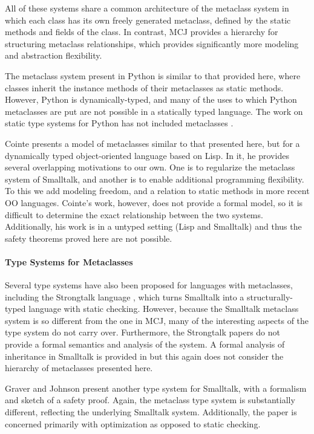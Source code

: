 \documentclass[nocopyrightspace,10pt]{acm-sigplan}
\begin{document}
All of these systems share a common architecture of the metaclass system
in which each class has its own freely generated metaclass, defined by
the static methods and fields of the class.  In contrast, MCJ
provides a hierarchy for structuring metaclass relationships, which
provides significantly more modeling and abstraction flexibility.

The metaclass system present in Python \cite{PythonMeta} is
similar to that provided here, where classes inherit the instance methods
of their metaclasses as static methods.  However,
Python is dynamically-typed, and many of the uses to which Python
metaclasses are put are not possible in a statically typed language.
The work on static type systems for Python has not included
metaclasses \cite{Starkiller}.

Cointe \cite{objvlisp} presents a model of metaclasses
similar to that presented here, but for a dynamically typed object-oriented
language based on Lisp.  In it, he provides several
overlapping motivations to our own.  One is to regularize the
metaclass system of Smalltalk, and another is to enable additional
programming flexibility.  To this we add modeling freedom, and a
relation to static methods in more recent OO languages.  Cointe's
work, however, does not provide a formal model, so it is difficult to
determine the exact relationship between the two systems.  Additionally,
his work is in a untyped setting (Lisp and Smalltalk) and thus the
safety theorems proved here are not possible. 

\paragraph{Type Systems for Metaclasses}
Several type systems have also been proposed for languages with
metaclasses, including the Strongtalk language \cite{Strongtalk},
which turns Smalltalk into a structurally-typed language with
static checking.  However, because the Small\-talk metaclass
system is so different from the one in MCJ, many of the interesting
aspects of the type system do not carry over.  Furthermore, the
Strongtalk papers do not provide a formal semantics and analysis of
the system.  A formal analysis of inheritance in Smalltalk is provided
in \cite{cook:thesis} but this again does not consider the hierarchy
of metaclasses presented here.

Graver and Johnson \cite{graver:90} present another type system for
Smalltalk, with a formalism and sketch of a safety proof.  Again, the
metaclass type system is substantially different, reflecting the
underlying Smalltalk system.  Additionally, the paper is concerned
primarily with optimization as opposed to static checking.
\end{document}
